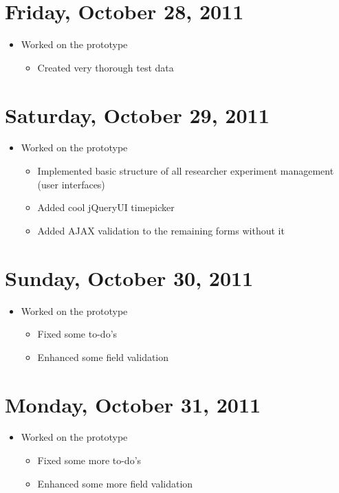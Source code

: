\documentclass{article}
\begin{document}
\section{Friday, October 28, 2011}
\begin{itemize}
\item Worked on the prototype
    \begin{itemize}
    \item Created very thorough test data
    \end{itemize}
\end{itemize}

\section{Saturday, October 29, 2011}
\begin{itemize}
\item Worked on the prototype
    \begin{itemize}
    \item Implemented basic structure of all researcher experiment management (user interfaces)
    \item Added cool jQueryUI timepicker
    \item Added AJAX validation to the remaining forms without it
    \end{itemize}
\end{itemize}

\section{Sunday, October 30, 2011}
\begin{itemize}
\item Worked on the prototype
    \begin{itemize}
    \item Fixed some to-do's
    \item Enhanced some field validation
    \end{itemize}
\end{itemize}

\section{Monday, October 31, 2011}
\begin{itemize}
\item Worked on the prototype
    \begin{itemize}
    \item Fixed some more to-do's
    \item Enhanced some more field validation
    \end{itemize}
\end{itemize}
\end{document}
